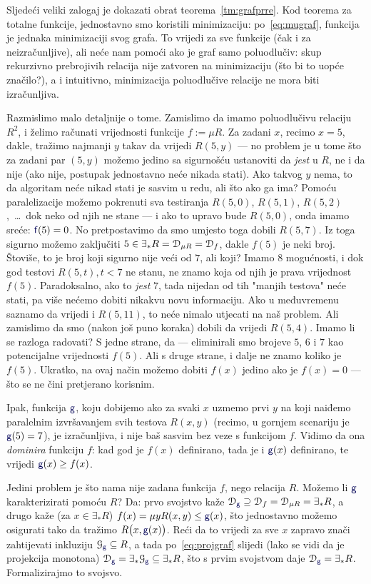 Sljedeći veliki zalogaj je dokazati obrat teorema~\ref{tm:grafprre}. Kod teorema za totalne funkcije, jednostavno smo koristili minimizaciju: po~\eqref{eq:mugraf}, funkcija je jednaka minimizaciji svog grafa. To vrijedi za sve funkcije (čak i za neizračunljive), ali neće nam pomoći ako je graf samo poluodlučiv: skup rekurzivno prebrojivih relacija nije zatvoren na minimizaciju (što bi to uopće značilo?), a i intuitivno, minimizacija poluodlučive relacije ne mora biti izračunljiva.

Razmislimo malo detaljnije o tome. Zamislimo da imamo poluodlučivu relaciju $R^2$, i želimo računati vrijednosti funkcije $f:=\mu R$. Za zadani $x$, recimo $x=5$, dakle, tražimo najmanji $y$ takav da vrijedi $R(5,y)$ --- no problem je u tome što za zadani par $(5,y)$ možemo jedino sa sigurnošću ustanoviti da \emph{jest} u $R$, ne i da nije (ako nije, postupak jednostavno neće nikada stati). Ako takvog $y$ nema, to da algoritam neće nikad stati je sasvim u redu, ali što ako ga ima? Pomoću paralelizacije možemo pokrenuti sva testiranja $R(5,0)$, $R(5,1)$, $R(5,2)$,~\ldots\ dok neko od njih ne stane --- i ako to upravo bude $R(5,0)$, onda imamo sreće: $\f f(5)=0$. No pretpostavimo da smo umjesto toga dobili $R(5,7)$. Iz toga sigurno možemo zaključiti $5\in\exists_*R=\mathcal D_{\mu R}=\mathcal D_{f}$, dakle $f(5)$ je neki broj. Štoviše, to je broj koji sigurno nije veći od $7$, ali koji? Imamo $8$ mogućnosti, i dok god testovi $R(5,t),t<7$ ne stanu, ne znamo koja od njih je prava vrijednost $f(5)$. Paradoksalno, ako to \emph{jest} $7$, tada nijedan od tih "manjih testova" neće stati, pa više nećemo dobiti nikakvu novu informaciju. Ako u međuvremenu saznamo da vrijedi i $R(5,11)$, to neće nimalo utjecati na naš problem. Ali zamislimo da smo (nakon još puno koraka) dobili da vrijedi $R(5,4)$. Imamo li se razloga radovati? S jedne strane, da --- eliminirali smo brojeve $5$, $6$ i $7$ kao potencijalne vrijednosti $f(5)$. Ali s druge strane, i dalje ne znamo koliko je $f(5)$. Ukratko, na ovaj način možemo dobiti $f(x)$ jedino ako je $f(x)=0$ --- što se ne čini pretjerano korisnim.

Ipak, funkcija $\f g$, koju dobijemo ako za svaki $x$ uzmemo prvi $y$ na koji naiđemo paralelnim izvršavanjem svih testova $R(x,y)$ (recimo, u gornjem scenariju je $\f g(5)=7$), je izračunljiva, i nije baš sasvim bez veze s funkcijom $f$. Vidimo da ona \emph{dominira} funkciju $f$: kad god je $f(x)$ definirano, tada je i $\f g(x)$ definirano, te vrijedi $\f g(x)\ge f(x)$.

Jedini problem je što nama nije zadana funkcija $f$, nego relacija $R$. Možemo li $\f g$ karakterizirati pomoću $R$? Da: prvo svojstvo kaže $\dom{\f g}\supseteq\dom f=\dom{\mu R}=\exists_*R$, a drugo kaže (za $x\in\exists_*R$) $f(x)=\mu yR(x,y)\le\f g(x)$, što jednostavno možemo osigurati tako da tražimo $R\bigl(x,\f g(x)\bigr)$. Reći da to vrijedi za sve $x$ zapravo znači zahtijevati inkluziju $\graf{\f g}\subseteq R$, a tada po~\eqref{eq:projgraf} slijedi (lako se vidi da je projekcija monotona) $\dom{\f g}=\exists_*\graf{\f g}\subseteq\exists_*R$, što s prvim svojstvom daje $\dom{\f g}=\exists_*R$. Formalizirajmo to svojsvo.

